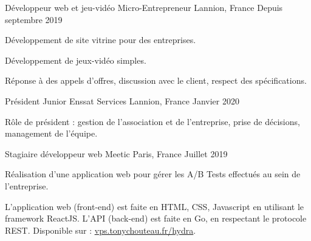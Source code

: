 

\begin{cventries}

  \cventry
    {Développeur web et jeu-vidéo} %
    {Micro-Entrepreneur} %
    {Lannion, France} %
    {Depuis septembre 2019} %
    {
      \begin{cvitems} %
        \item {Développement de site vitrine pour des entreprises.}
        \item {Développement de jeux-vidéo simples.}
        \item {Réponse à des appels d'offres, discussion avec le client, respect des spécifications.}
      \end{cvitems}
    }

  \cventry
    {Président} %
    {Junior Enssat Services} %
    {Lannion, France} %
    {Janvier 2020} %
    {
      \begin{cvitems} %
        \item {Rôle de président : gestion de l'association et de l'entreprise, prise de décisions, management de l'équipe.}
      \end{cvitems}
    }

  \cventry
    {Stagiaire développeur web} %
    {Meetic} %
    {Paris, France} %
    {Juillet 2019} %
    {
      \begin{cvitems} %
        \item {Réalisation d'une application web pour gérer les A/B Tests effectués au sein de l'entreprise.}
        \item {L'application web (front-end) est faite en HTML, CSS, Javascript en utilisant le framework ReactJS. L'API (back-end) est faite en Go, en respectant le protocole REST. Disponible sur : \underline{\href{http://vps.tonychouteau.fr/hydra}{vps.tonychouteau.fr/hydra}}.}
      \end{cvitems}
    }

\end{cventries}
